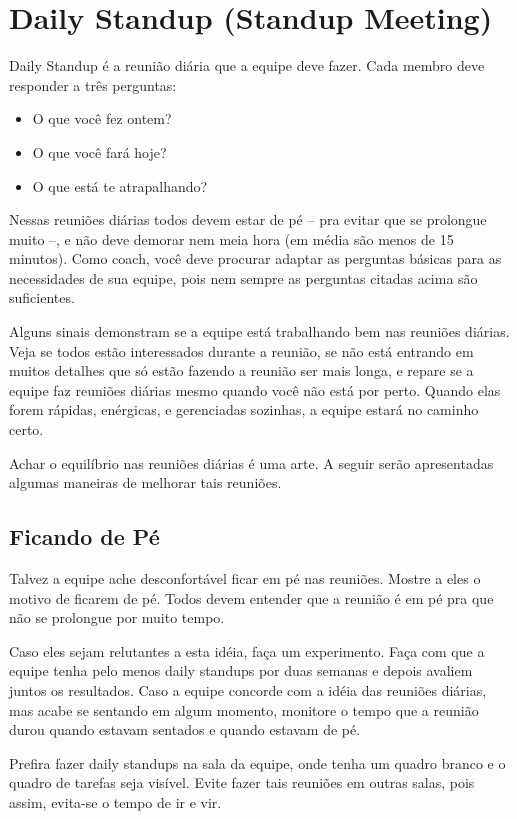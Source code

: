 \documentclass[a4paper, 10pt, font=plain]{abnt}
\begin{document}
\chapter{Daily Standup (Standup Meeting)}
Daily Standup é a reunião diária que a equipe deve fazer. Cada membro deve responder a três perguntas:
\begin{itemize}
\item O que você fez ontem?
\item O que você fará hoje?
\item O que está te atrapalhando?
\end{itemize}

Nessas reuniões diárias todos devem estar de pé -- pra evitar que se prolongue muito --, e não deve demorar nem meia hora (em média são menos de 15 minutos). Como coach, você deve procurar adaptar as perguntas básicas para as necessidades de sua equipe, pois nem sempre as perguntas citadas acima são suficientes.

Alguns sinais demonstram se a equipe está trabalhando bem nas reuniões diárias. Veja se todos estão interessados durante a reunião, se não está entrando em muitos detalhes que só estão fazendo a reunião ser mais longa, e repare se a equipe faz reuniões diárias mesmo quando você não está por perto. Quando elas forem rápidas, enérgicas, e gerenciadas sozinhas, a equipe estará no caminho certo.

Achar o equilíbrio nas reuniões diárias é uma arte. A seguir serão apresentadas algumas maneiras de melhorar tais reuniões.


\section{Ficando de Pé}
Talvez a equipe ache desconfortável ficar em pé nas reuniões. Mostre a eles o motivo de ficarem de pé. Todos devem entender que a reunião é em pé pra que não se prolongue por muito tempo.

Caso eles sejam relutantes a esta idéia, faça um experimento. Faça com que a equipe tenha pelo menos daily standups por duas semanas e depois avaliem juntos os resultados. Caso a equipe concorde com a idéia das reuniões diárias, mas acabe se sentando em algum momento, monitore o tempo que a reunião durou quando estavam sentados e quando estavam de pé.

Prefira fazer daily standups na sala da equipe, onde tenha um quadro branco e o quadro de tarefas seja visível. Evite fazer tais reuniões em outras salas, pois assim, evita-se o tempo de ir e vir.
\end{document}
